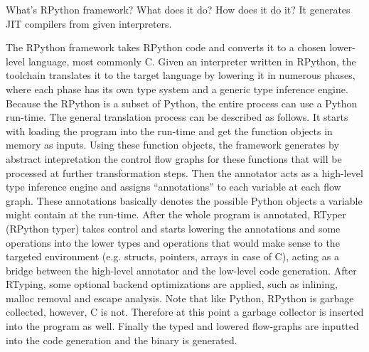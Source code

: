         \begin{paragraph-here}
            What's RPython framework? What does it do? How does it do it? It generates JIT compilers from given interpreters.

            The RPython framework takes RPython code and converts it to a chosen
            lower-level language, most commonly C. Given an interpreter written in
            RPython, the toolchain translates it to the target language by
            lowering it in numerous phases, where each phase has its own type
            system and a generic type inference engine. Because the RPython is a
            subset of Python, the entire process can use a Python run-time. The
            general translation process can be described as follows. It starts
            with loading the program into the run-time and get the function
            objects in memory as inputs. Using these function objects, the
            framework generates by abstract intepretation the control flow graphs
            for these functions that will be processed at further transformation
            steps. Then the annotator acts as a high-level type inference engine
            and assigns ``annotations'' to each variable at each flow graph. These
            annotations basically denotes the possible Python objects a variable
            might contain at the run-time. After the whole program is annotated,
            RTyper (RPython typer) takes control and starts lowering the
            annotations and some operations into the lower types and operations
            that would make sense to the targeted environment (e.g. structs,
            pointers, arrays in case of C), acting as a bridge between the
            high-level annotator and the low-level code generation. After RTyping,
            some optional backend optimizations are applied, such as inlining,
            malloc removal and escape analysis. Note that like Python, RPython is
            garbage collected, however, C is not. Therefore at this point a
            garbage collector is inserted into the program as well. Finally the
            typed and lowered flow-graphs are inputted into the code generation
            and the binary is generated. \cite{rpython07, pypy06, pypy08}
        \end{paragraph-here}



